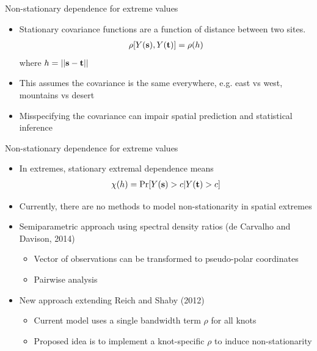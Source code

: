 \documentclass{beamer}
\begin{document}
\begin{frame}{Non-stationary dependence for extreme values}
  \begin{itemize} \setlength{\itemsep}{1em}
    \item Stationary covariance functions are a function of distance between two sites.
    \begin{align*}
      \rho[Y(\mbox{\bf s}), Y(\mbox{\bf t})] = \rho(h)
    \end{align*}
    where $h = ||\mbox{\bf s} - \mbox{\bf t}||$
    \item This assumes the covariance is the same everywhere, e.g. east vs west, mountains vs desert
    \item Misspecifying the covariance can impair spatial prediction and statistical inference
  \end{itemize}
\end{frame}

\begin{frame}{Non-stationary dependence for extreme values}
  \begin{itemize} \setlength{\itemsep}{0.5em}
    \item In extremes, stationary extremal dependence means
    \begin{align*}
      \chi(h) = \Pr[Y(\mbox{\bf s}) > c | Y(\mbox{\bf t}) > c]
    \end{align*}
    \item Currently, there are no methods to model non-stationarity in spatial extremes
    \item Semiparametric approach using spectral density ratios (de Carvalho and Davison, 2014)
    \begin{itemize} \setlength{\itemsep}{0.25em}
      \item Vector of observations can be transformed to pseudo-polar coordinates
      \item Pairwise analysis
    \end{itemize}
    \item New approach extending Reich and Shaby (2012)
    \begin{itemize} \setlength{\itemsep}{0.25em}
      \item Current model uses a single bandwidth term $\rho$ for all knots
      \item Proposed idea is to implement a knot-specific $\rho$ to induce non-stationarity
    \end{itemize}
  \end{itemize}
\end{frame}
\end{document}
